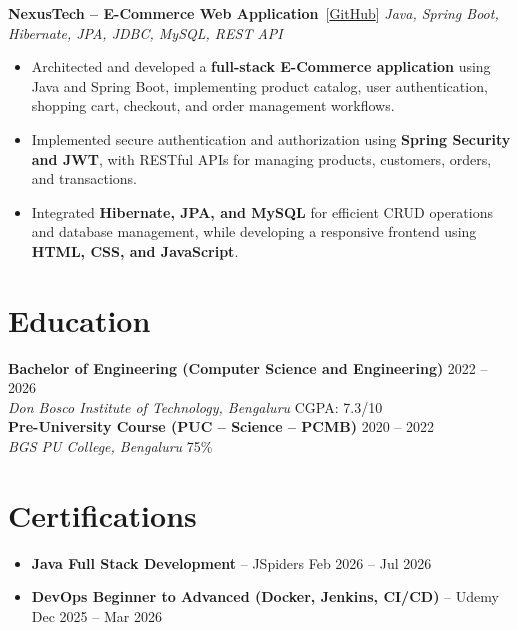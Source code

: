 \documentclass[9.5pt,a4paper]{article}
\begin{document}
\vspace{1.5pt}
\textbf{NexusTech -- E-Commerce Web Application} \,[\href{https://github.com/preethamvs6/nexusTech}{GitHub}] \hfill \textit{Java, Spring Boot, Hibernate, JPA, JDBC, MySQL, REST API}
\begin{itemize}
    \item Architected and developed a \textbf{full-stack E-Commerce application} using Java and Spring Boot, implementing product catalog, user authentication, shopping cart, checkout, and order management workflows.
    \item Implemented secure authentication and authorization using \textbf{Spring Security and JWT}, with RESTful APIs for managing products, customers, orders, and transactions.
    \item Integrated \textbf{Hibernate, JPA, and MySQL} for efficient CRUD operations and database management, while developing a responsive frontend using \textbf{HTML, CSS, and JavaScript}.
\end{itemize}

\section{Education}
\textbf{Bachelor of Engineering (Computer Science and Engineering)} \hfill 2022 -- 2026\\
\textit{Don Bosco Institute of Technology, Bengaluru} \hfill CGPA: 7.3/10\\[1.5pt]
\textbf{Pre-University Course (PUC -- Science -- PCMB)} \hfill 2020 -- 2022\\
\textit{BGS PU College, Bengaluru} \hfill 75\%

\section{Certifications}
\begin{itemize}
    \item \textbf{Java Full Stack Development} -- JSpiders \hfill Feb 2026 -- Jul 2026
    \item \textbf{DevOps Beginner to Advanced (Docker, Jenkins, CI/CD)} -- Udemy \hfill Dec 2025 -- Mar 2026
\end{itemize}
\end{document}
